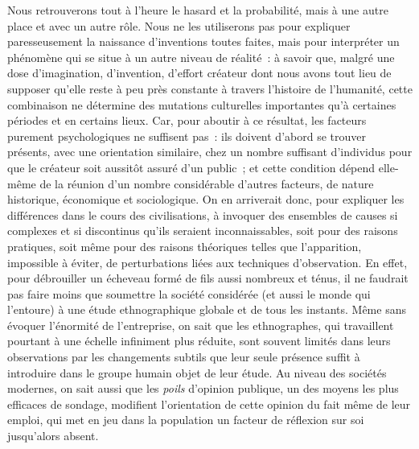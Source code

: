 \documentclass[french,twoside]{book} %
\begin{document}
Nous retrouverons tout à l’heure le hasard et la probabilité, mais à une autre place et avec un autre rôle. Nous ne les utiliserons pas pour expliquer paresseusement la naissance d’inventions toutes faites, mais pour interpréter un phénomène qui se situe à un autre niveau de réalité : à savoir que, malgré une dose d’imagination, d’invention, d’effort créateur dont nous avons tout lieu de supposer qu’elle reste à peu près constante à travers l’histoire de l’humanité, cette combinaison ne détermine des mutations culturelles importantes qu’à certaines périodes et en certains lieux. Car, pour aboutir à ce résultat, les facteurs purement psychologiques ne suffisent pas : ils doivent d’abord se trouver présents, avec une orientation similaire, chez un nombre suffisant d’individus pour que le créateur soit aussitôt assuré d’un public ; et cette condition dépend elle-même de la réunion d’un nombre considérable d’autres facteurs, de nature historique, économique et sociologique. On en arriverait donc, pour expliquer les différences dans le cours des civilisations, à invoquer des ensembles de causes si complexes et si discontinus qu’ils seraient inconnaissables, soit pour des raisons pratiques, soit même pour des raisons théoriques telles que l’apparition, impossible à éviter, de perturbations liées aux techniques d’observation. En effet, pour débrouiller un écheveau formé de fils aussi nombreux et ténus, il ne faudrait pas faire moins que soumettre la société considérée (et aussi le monde qui l’entoure) à une étude ethnographique globale et de tous les instants. Même sans évoquer l’énormité de l’entreprise, on sait que les ethnographes, qui travaillent pourtant à une échelle infiniment plus réduite, sont souvent limités dans leurs observations par les changements subtils que leur seule présence suffit à introduire dans le groupe humain objet de leur étude. Au niveau des sociétés modernes, on sait aussi que les \emph{poils} d’opinion publique, un des moyens les plus efficaces de sondage, modifient l’orientation de cette opinion du fait même de leur emploi, qui met en jeu dans la population un facteur de réflexion sur soi jusqu’alors absent.\par
\end{document}
